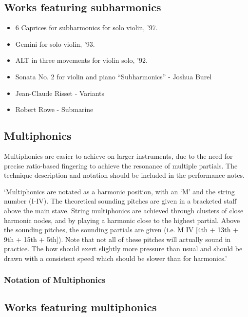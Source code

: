 \subsection{Works featuring subharmonics }\label{sec:subharmonicsLiterature}

\begin{itemize}
    \item 6 Caprices for subharmonics for solo violin, '97.
    \item Gemini for solo violin, '93.
    \item ALT in three movements for violin solo, '92.
    \item Sonata No. 2 for violin and piano “Subharmonics” - Joshua Burel
    \item Jean-Claude Risset - Variants
    \item Robert Rowe - Submarine
\end{itemize}

\subsection{Multiphonics} \label{sec:multiphonics}
Multiphonics are easier to achieve on larger instruments, due to the need for precise ratio-based fingering to achieve the resonance of multiple partials.
The technique description and notation should be included in the performance notes.


`Multiphonics are notated as a harmonic position, with an `M' and the string number (I-IV). 
The theoretical sounding pitches are given in a bracketed staff above the main stave.
String multiphonics are achieved through clusters of close harmonic nodes, and by playing a harmonic close to the highest partial.
Above the sounding pitches, the sounding partials are given (i.e. M IV [4th + 13th + 9th + 15th + 5th]).
Note that not all of these pitches will actually sound in practice.
The bow should exert slightly more pressure than usual and should be drawn with a consistent speed which should be slower than for harmonics.'

\subsubsection{Notation of Multiphonics} \label{sec:notation-multiphonics}

\subsection{Works featuring multiphonics} \label{sec:multiphonicsLiterature}

